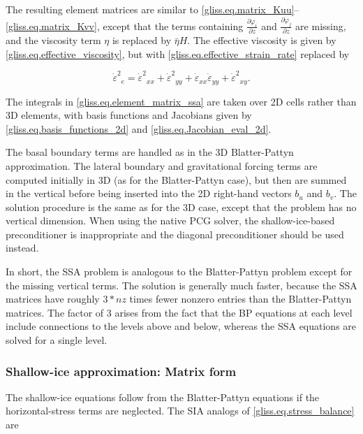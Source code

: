 \noindent
The resulting element matrices are similar to \eqref{gliss.eq.matrix_Kuu}--\eqref{gliss.eq.matrix_Kvv},
except that the terms containing $\frac{\partial {{\varphi }_{i}}}{\partial z}$ and
$\frac{\partial {{\varphi }_{j}}}{\partial z}$ are missing, and the viscosity term $\eta$
is replaced by $\bar{\eta} H$.  The effective viscosity is given by \eqref{gliss.eq.effective_viscosity},
but with \eqref{gliss.eq.effective_strain_rate} replaced by

\begin{equation}
  \label{gliss.eq.effective_strain_rate_ssa}
        {{\dot{\varepsilon }}^{2}}_{e} = 
        {{\dot{\varepsilon }}^{2}}_{xx} + {{\dot{\varepsilon }}^{2}}_{yy} + 
        {{\dot{\varepsilon }}_{xx}}{{\dot{\varepsilon }}_{yy}} + {{\dot{\varepsilon }}^{2}}_{xy}.
\end{equation}

\noindent
The integrals in \eqref{gliss.eq.element_matrix_ssa} are taken over 2D cells rather than 3D elements,
with basis functions and Jacobians given by \eqref{gliss.eq.basis_functions_2d}
and \eqref{gliss.eq.Jacobian_eval_2d}.

The basal boundary terms are handled as in the 3D Blatter-Pattyn approximation. 
The lateral boundary and gravitational forcing terms are computed initially in 3D
(as for the Blatter-Pattyn case), but then are summed in the vertical before being
inserted into the 2D right-hand vectors $b_u$ and $b_v$.  The solution procedure
is the same as for the 3D case, except that the problem has no vertical dimension.
When using the native PCG solver, the shallow-ice-based preconditioner is inappropriate
and the diagonal preconditioner should be used instead.  

In short, the SSA problem is analogous to the Blatter-Pattyn problem except for the
missing vertical terms.  The solution is generally much faster, because the SSA matrices
have roughly $3*nz$ times fewer nonzero entries than the Blatter-Pattyn matrices.
The factor of 3 arises from the fact that the BP equations at each level include
connections to the levels above and below, whereas the SSA equations
are solved for a single level.

\subsubsection{Shallow-ice approximation: Matrix form}

The shallow-ice equations follow from the Blatter-Pattyn equations if the horizontal-stress
terms are neglected.  The SIA analogs of \eqref{gliss.eq.stress_balance} are

